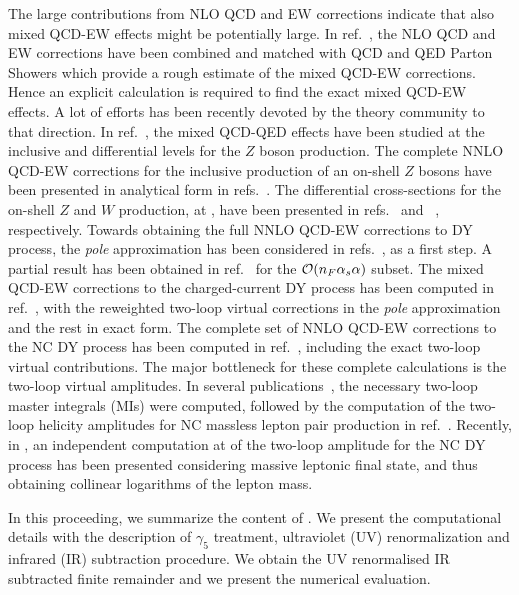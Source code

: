 \documentclass[a4paper]{jpconf}
\begin{document}
The large contributions from NLO QCD and EW corrections indicate that also mixed QCD-EW effects might be potentially large.
% 
In ref.~\cite{Bernaciak:2012hj,Barze:2012tt,Barze:2013fru,Frederix:2018nkq}, the NLO QCD and EW corrections have been combined
and matched with QCD and QED Parton Showers which provide a rough estimate of the mixed QCD-EW corrections.
Hence an explicit calculation is required to find the exact mixed QCD-EW effects.
% 
A lot of efforts has been recently devoted by the theory community to that direction.
In ref.~\cite{deFlorian:2018wcj,Delto:2019ewv,Cieri:2020ikq}, the mixed QCD-QED effects have been studied 
at the inclusive and differential levels for the $Z$ boson production.
% 
The complete NNLO QCD-EW corrections for the inclusive production of an on-shell $Z$ bosons have been presented in analytical form
in refs.~\cite{Bonciani:2016wya,Bonciani:2019nuy,Bonciani:2020tvf,Bonciani:2021iis}.
The differential cross-sections for the on-shell $Z$ and $W$ production, at \oaas,
have been presented in refs.~\cite{Buccioni:2020cfi} and ~\cite{Behring:2020cqi}, respectively.
% 
Towards obtaining the full NNLO QCD-EW corrections to DY process, 
the {\it pole} approximation \cite{Denner:2019vbn} has been considered in refs.~\cite{Dittmaier:2014qza,Dittmaier:2015rxo}, 
as a first step.
% 
A partial result has been obtained in ref.~\cite{Dittmaier:2020vra} for the ${\cal O}(n_F\as \alpha)$ subset.
The mixed QCD-EW corrections to the charged-current DY process has been computed in ref.~\cite{Buonocore:2021rxx},
with the reweighted two-loop virtual corrections in the {\it pole} approximation
and the rest in exact form.
% 
The complete set of NNLO QCD-EW corrections to the NC DY process 
has been computed in ref.~\cite{Bonciani:2021zzf}, including the exact two-loop virtual contributions.
% 
The major bottleneck for these complete calculations is the two-loop virtual amplitudes. 
% 
In several publications~\cite{Bonciani:2016ypc,Heller:2019gkq,Hasan:2020vwn,Long:2021fdc},
the necessary two-loop master integrals (MIs) were computed, followed by
the computation of the two-loop helicity amplitudes for NC massless lepton pair production in ref.~\cite{Heller:2020owb}.
% 
Recently, in \cite{Armadillo:2022bgm}, an independent computation at \oaas of the two-loop amplitude for the NC DY process
has been presented considering massive leptonic final state, and thus
obtaining collinear logarithms of the lepton mass.


In this proceeding, we summarize the content of \cite{Armadillo:2022bgm}. We present the computational details
with the description of $\gamma_5$ treatment, ultraviolet (UV) renormalization and infrared (IR)
subtraction procedure. We obtain the UV renormalised IR subtracted finite remainder and we present the 
numerical evaluation.
\end{document}
